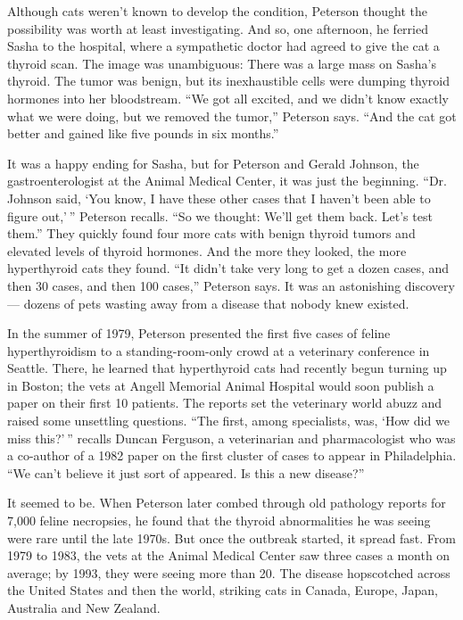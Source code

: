 Although cats weren't known to develop the condition, Peterson thought
the possibility was worth at least investigating. And so, one afternoon,
he ferried Sasha to the hospital, where a sympathetic doctor had agreed
to give the cat a thyroid scan. The image was unambiguous: There was a
large mass on Sasha's thyroid. The tumor was benign, but its
inexhaustible cells were dumping thyroid hormones into her bloodstream.
``We got all excited, and we didn't know exactly what we were doing, but
we removed the tumor,'' Peterson says. ``And the cat got better and
gained like five pounds in six months.''

It was a happy ending for Sasha, but for Peterson and Gerald Johnson,
the gastroenterologist at the Animal Medical Center, it was just the
beginning. ``Dr. Johnson said, `You know, I have these other cases that
I haven't been able to figure out,' '' Peterson recalls. ``So we
thought: We'll get them back. Let's test them.'' They quickly found four
more cats with benign thyroid tumors and elevated levels of thyroid
hormones. And the more they looked, the more hyperthyroid cats they
found. ``It didn't take very long to get a dozen cases, and then 30
cases, and then 100 cases,'' Peterson says. It was an astonishing
discovery --- dozens of pets wasting away from a disease that nobody
knew existed.

In the summer of 1979, Peterson presented the first five cases of feline
hyperthyroidism to a standing-room-only crowd at a veterinary conference
in Seattle. There, he learned that hyperthyroid cats had recently begun
turning up in Boston; the vets at Angell Memorial Animal Hospital would
soon publish a paper on their first 10 patients. The reports set the
veterinary world abuzz and raised some unsettling questions. ``The
first, among specialists, was, `How did we miss this?' '' recalls Duncan
Ferguson, a veterinarian and pharmacologist who was a co-author of a
1982 paper on the first cluster of cases to appear in Philadelphia. ``We
can't believe it just sort of appeared. Is this a new disease?''

It seemed to be. When Peterson later combed through old pathology
reports for 7,000 feline necropsies, he found that the thyroid
abnormalities he was seeing were rare until the late 1970s. But once the
outbreak started, it spread fast. From 1979 to 1983, the vets at the
Animal Medical Center saw three cases a month on average; by 1993, they
were seeing more than 20. The disease hopscotched across the United
States and then the world, striking cats in Canada, Europe, Japan,
Australia and New Zealand.

